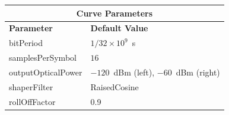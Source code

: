 \begin{refsection}
\begin{table}[H]
			\centering
			
	\begin{tabular}{|l|l|}
		\hline
		\multicolumn{2}{|c|}{ \textbf{Curve Parameters} } \\
		\hline
		\textbf{Parameter}     & \textbf{Default 
		Value}                                     \\\hline
		bitPeriod              & 
		$1/32\times10^9$~s														
		\\\hline
		samplesPerSymbol       & 
		$16$                                                       \\\hline
		outputOpticalPower     & $-120$~dBm (left), $-60$~dBm 
		(right)                       \\ \hline
		shaperFilter	       & 
		RaisedCosine												\\ \hline
		rollOffFactor		   & 
		0.9														\\ \hline
		

\end{tabular}
\end{table}
\end{refsection}

